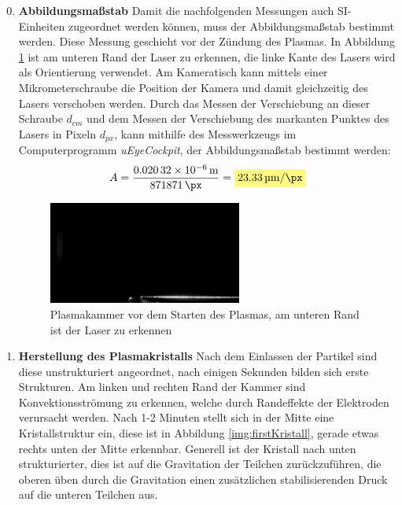 \documentclass[12pt,a4paper,ngerman]{article}
\newcommand{\highlight}[1]{%
	\colorbox{yellow!50}{$\displaystyle#1$}} %
\begin{document}
	\begin{enumerate}[font=\bfseries]
		\setcounter{enumi}{-1}
		\item \textbf{Abbildungsmaßstab}
		Damit die nachfolgenden Messungen auch SI-Einheiten zugeordnet werden können, muss der Abbildungsmaßstab bestimmt werden. Diese Messung geschieht vor der Zündung des Plasmas. In Abbildung \ref{img:Kalibration} ist am unteren Rand der Laser zu erkennen, die linke Kante des Lasers wird als Orientierung verwendet. Am Kameratisch kann mittels einer Mikrometerschraube die Position der Kamera und damit gleichzeitig des Lasers verschoben werden. Durch das Messen der Verschiebung an dieser Schraube $d_{cm}$ und dem Messen der Verschiebung des markanten Punktes des Lasers in Pixeln $d_{px}$, kann mithilfe des Messwerkzeugs im Computerprogramm \textit{uEyeCockpit}, der Abbildungsmaßstab bestimmt werden:
		\begin{equation}
			A = \frac{\SI{0.02032E-6}{\meter}}{871 \SI{871}{\px}} = \highlight{\SI{23.33}{\micro \meter \per \px}}
		\end{equation}  
		
		\begin{figure}[ht]
			\centering
			\includegraphics[width=0.6\textwidth]{data/calibration.png}		
			\caption{Plasmakammer vor dem Starten des Plasmas, am unteren Rand ist der Laser zu erkennen}
			\label{img:Kalibration}
		\end{figure}
		\item\textbf{Herstellung des Plasmakristalls}
		Nach dem Einlassen der Partikel sind diese unstrukturiert angeordnet, nach einigen Sekunden bilden sich erste Strukturen. Am linken und rechten Rand der Kammer sind Konvektionsströmung zu erkennen, welche durch Randeffekte der Elektroden verursacht werden. Nach 1-2 Minuten stellt sich in der Mitte eine Kristallstruktur ein, diese ist in Abbildung \ref{img:firstKristall}, gerade etwas rechts unten der Mitte erkennbar. Generell ist der Kristall nach unten strukturierter, dies ist auf die Gravitation der Teilchen zurückzuführen, die oberen üben durch die Gravitation einen zusätzlichen stabilisierenden Druck auf die unteren Teilchen aus.
		

\end{enumerate}
\end{document}
